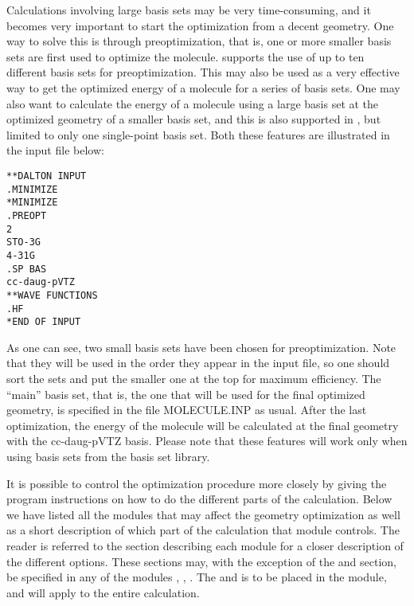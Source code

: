 Calculations involving large basis sets may be very time-consuming,
and it becomes very important to start the optimization from a decent
geometry. One way to solve this is through
preoptimization, that is, 
one or more smaller basis sets are first used to optimize the
molecule. {\siraba} supports the use of up to ten different basis sets
for preoptimization. This may also be used as a very effective way to
get the optimized energy of a molecule for a series of basis
sets. One may also want to calculate the energy of a molecule using a
large basis set at the optimized geometry of a smaller basis set, and
this is also supported in {\siraba}, but limited to only one single-point
basis set. Both these features are illustrated in the input file below:

\begin{verbatim}
**DALTON INPUT
.MINIMIZE
*MINIMIZE
.PREOPT
2
STO-3G
4-31G
.SP BAS
cc-daug-pVTZ
**WAVE FUNCTIONS
.HF
*END OF INPUT
\end{verbatim}

As one can see, two small basis sets have been chosen for
preoptimization. Note that they will be used in
the order they appear 
in the input file, so one should sort the sets and put the smaller one
at the top for maximum efficiency. The ``main'' basis set, that is, the
one that will be used for the final optimized geometry, is specified
in the file MOLECULE.INP as usual. After the last optimization, the
energy of the molecule will be calculated at the final geometry with the
cc-daug-pVTZ basis. Please note that these features will work only
when using basis sets from the basis set library.

It is possible to control the optimization procedure more closely
by giving the program instructions on how to do the different parts of
the calculation. Below we have listed all the modules that may
affect the geometry optimization  as well as a short description of
which part of the calculation that module controls. The reader is
referred to the section describing each module for a closer
description of the different options. These sections may, with the
exception of the  and  section, be specified
in any of the modules , ,
. The  and  is
to be placed in the  module, and will apply to the
entire calculation.

